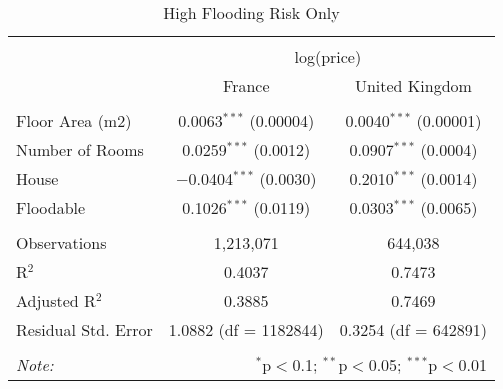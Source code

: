 
\begin{table}[!htbp] \centering 
  \caption{High Flooding Risk Only\vspace*{-0.2cm}} 
  \label{} 
\small 
\begin{tabular}{@{\extracolsep{5pt}}lcc} 
\\[-1.8ex]\hline 
\hline \\[-1.8ex] 
 & \multicolumn{2}{c}{log(price)} \\ 
\cline{2-3} 
 & France & United Kingdom \\ 
\hline \\[-1.8ex] 
 Floor Area (m2) & 0.0063$^{***}$ (0.00004) & 0.0040$^{***}$ (0.00001) \\ 
  Number of Rooms & 0.0259$^{***}$ (0.0012) & 0.0907$^{***}$ (0.0004) \\ 
  House & $-$0.0404$^{***}$ (0.0030) & 0.2010$^{***}$ (0.0014) \\ 
  Floodable & 0.1026$^{***}$ (0.0119) & 0.0303$^{***}$ (0.0065) \\ 
 \hline \\[-1.8ex] 
Observations & 1,213,071 & 644,038 \\ 
R$^{2}$ & 0.4037 & 0.7473 \\ 
Adjusted R$^{2}$ & 0.3885 & 0.7469 \\ 
Residual Std. Error & 1.0882 (df = 1182844) & 0.3254 (df = 642891) \\ 
\hline 
\hline \\[-1.8ex] 
\textit{Note:}  & \multicolumn{2}{r}{$^{*}$p$<$0.1; $^{**}$p$<$0.05; $^{***}$p$<$0.01} \\ 
\end{tabular} 
\end{table} 

